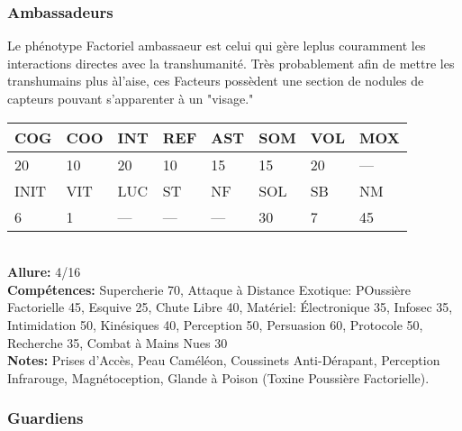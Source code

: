 \subsubsection{Ambassadeurs} Le phénotype Factoriel ambassaeur est celui qui gère leplus couramment les interactions directes avec la transhumanité. Très probablement afin de mettre les transhumains plus àl'aise, ces Facteurs possèdent une section de nodules de capteurs pouvant s'apparenter à un "visage." \\ \begin{tabular}{|l|l|l|l|l|l|l|l|} \hline

COG &COO &INT &REF &AST &SOM &VOL &MOX \\ \hline

20 &10 &20 &10 &15 &15 &20 &— \\ \hline

INIT &VIT &LUC &ST &NF &SOL &SB &NM \\ \hline

6 &1 &— &— &— &30 &7 &45 \\ \hline

\end{tabular} \\ \textbf{Allure: }4/16 \\ \textbf{Compétences:} Supercherie 70, Attaque à Distance Exotique: POussière Factorielle 45, Esquive 25, Chute Libre 40, Matériel: Électronique 35, Infosec 35, Intimidation 50, Kinésiques 40, Perception 50, Persuasion 60, Protocole 50, Recherche 35, Combat à Mains Nues 30 \\ \textbf{Notes: }Prises d'Accès, Peau Caméléon, Coussinets Anti-Dérapant, Perception Infrarouge, Magnétoception, Glande à Poison (Toxine Poussière Factorielle). 

\subsubsection{Guardiens} 

